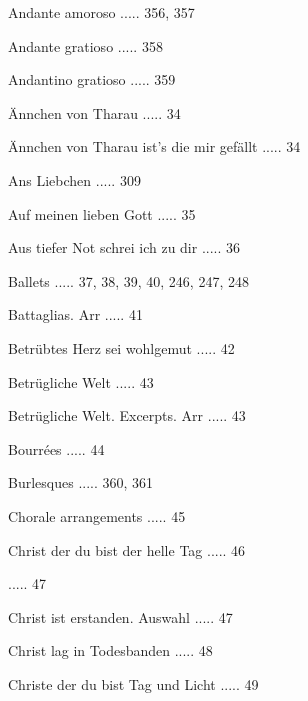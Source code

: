 \documentclass[twocolumn]{book}
\begin{document}
\newline 
Andante amoroso ..... 356, 357

\newline 
Andante gratioso ..... 358

\newline 
Andantino gratioso ..... 359

\newline 
Ännchen von Tharau ..... 34

\newline 
Ännchen von Tharau ist's die mir gefällt ..... 34

\newline 
Ans Liebchen ..... 309

\newline 
Auf meinen lieben Gott ..... 35

\newline 
Aus tiefer Not schrei ich zu dir ..... 36

\newline 
Ballets ..... 37, 38, 39, 40, 246, 247, 248

\newline 
Battaglias. Arr ..... 41

\newline 
Betrübtes Herz sei wohlgemut ..... 42

\newline 
Betrügliche Welt ..... 43

\newline 
Betrügliche Welt. Excerpts. Arr ..... 43

\newline 
Bourrées ..... 44

\newline 
Burlesques ..... 360, 361

\newline 
Chorale arrangements ..... 45

\newline 
Christ der du bist der helle Tag ..... 46

 ..... 47

\newline 
Christ ist erstanden. Auswahl ..... 47

\newline 
Christ lag in Todesbanden ..... 48

\newline 
Christe der du bist Tag und Licht ..... 49
\end{document}
